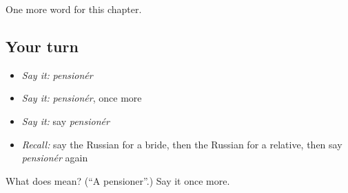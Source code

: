 \begin{grammarlens}[title={What you've built}]
One more word for this chapter.
\end{grammarlens}

\subsection*{Your turn}
\begin{itemize}
\raggedright
  \item \emph{Say it:} \emph{pensionér}
  \item \emph{Say it:} \emph{pensionér}, once more
  \item \emph{Say it:} say \emph{pensionér}
  \item \emph{Recall:} say the Russian for a bride, then the Russian for a relative, then say \emph{pensionér} again
\end{itemize}

\begin{tcolorbox}[breakable,colback=teal!4,colframe=teal!35!black,title={Before you move on}]
What does  mean? (\textquotedblleft{}A pensioner\textquotedblright{}.) Say it once more.
\end{tcolorbox}
